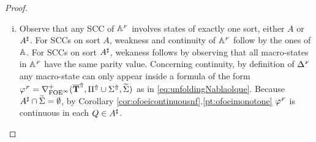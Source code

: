 \begin{proof}
\begin{enumerate}[(i)]
\item 
Observe that any SCC of $\mathbb{A}^{{\scriptscriptstyle F}}$ involves states of exactly one sort, 
either $A$ or $A^{\sharp}$. 
For SCCs on sort $A$, weakness and continuity of $\mathbb{A}^{{\scriptscriptstyle F}}$ follow by the 
ones of $\mathbb{A}$. 
For SCCs on sort $A^{\sharp}$, wekaness follows by observing that all macro-states in
$\mathbb{A}^{{\scriptscriptstyle F}}$ have the same parity value. 
Concerning continuity, by definition of $\Delta^{{\scriptscriptstyle F}}$ any macro-state can only 
appear inside a formula of the form $\varphi^{{\scriptscriptstyle F}} = 
\nabla^+_{\mathrm{FOE}^{\infty}}(\overline{{\mathbf{T}}}^{\Uparrow},\Pi^{\Uparrow} \cup \Sigma^{\Uparrow},\widetilde{\Sigma})$ as in \eqref{eq:unfoldingNablaolque}. Because $A^{\sharp} \cap \widetilde{\Sigma} = \emptyset$, by Corollary \ref{cor:ofoeicontinuousnf}.\ref{pt:ofoeimonotone} $\varphi^{{\scriptscriptstyle F}}$ is continuous in each $Q \in A^{\sharp}$.
 

\end{enumerate}
\end{proof}
